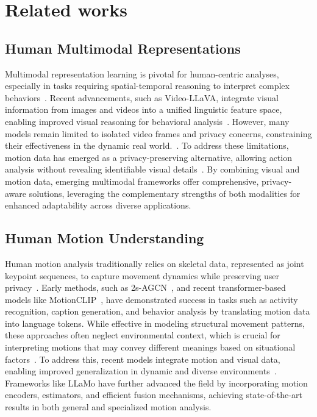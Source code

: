 \section{Related works}
\subsection{Human Multimodal Representations}

Multimodal representation learning is pivotal for human-centric analyses, especially in tasks requiring spatial-temporal reasoning to interpret complex behaviors~\cite{lin2023videollm, ning2023videobench, li2023videochat}. Recent advancements, such as Video-LLaVA, integrate visual information from images and videos into a unified linguistic feature space, enabling improved visual reasoning for behavioral analysis~\cite{lin2023videollm}. However, many models remain limited to isolated video frames and privacy concerns, constraining their effectiveness in the dynamic real world.~\cite{ning2023videobench, heilbron2015activitynet, maaz2023video}. To address these limitations, motion data has emerged as a privacy-preserving alternative, allowing action analysis without revealing identifiable visual details~\cite{song2023adaptive, yang2023recognizing}. By combining visual and motion data, emerging multimodal frameworks offer comprehensive, privacy-aware solutions, leveraging the complementary strengths of both modalities for enhanced adaptability across diverse applications.

\subsection{Human Motion Understanding}

Human motion analysis traditionally relies on skeletal data, represented as joint keypoint sequences, to capture movement dynamics while preserving user privacy~\cite{shi2023learning, plappert2018bidirectional, yang2023understanding}. Early methods, such as 2s-AGCN~\cite{shi2019two}, and recent transformer-based models like MotionCLIP~\cite{chen2023motiongpt}, have demonstrated success in tasks such as activity recognition, caption generation, and behavior analysis by translating motion data into language tokens. While effective in modeling structural movement patterns, these approaches often neglect environmental context, which is crucial for interpreting motions that may convey different meanings based on situational factors~\cite{song2023finegrained, maaz2023video}. To address this, recent models integrate motion and visual data, enabling improved generalization in dynamic and diverse environments~\cite{liu2024pose, he2023activitynet}. Frameworks like LLaMo\cite{li2024human} have further advanced the field by incorporating motion encoders, estimators, and efficient fusion mechanisms, achieving state-of-the-art results in both general and specialized motion analysis.


